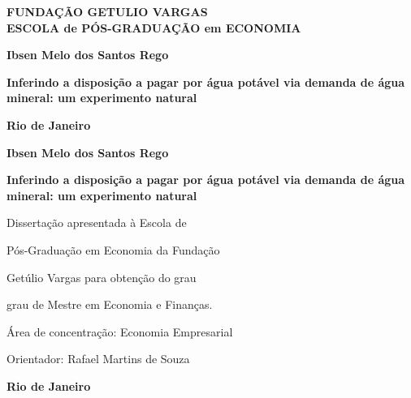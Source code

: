 \documentclass[
  12pt,
]{book}
\author{}
\date{\vspace{-2.5em}}
\begin{document}

\begin{titlepage}

	\begin{center}
		{\LARGE \textbf{FUNDAÇÃO GETULIO VARGAS\\ ESCOLA de PÓS-GRADUAÇÃO em ECONOMIA}}

		\par
		\vspace{120pt}
		{\LARGE \textbf{Ibsen Melo dos Santos Rego}}

		\par
		\vspace{120pt}
		{\Huge \textbf{Inferindo a disposição a pagar por água potável via demanda de água mineral: um experimento natural}}

		\par
		\vfill
		\textbf{{\large Rio de Janeiro}\\
		{\large \number\year}}
	\end{center}
\end{titlepage}
\begin{titlepage}
    \begin{center}
		{\LARGE \textbf{Ibsen Melo dos Santos Rego}}

		\par
		\vspace{120pt}
		{\LARGE \textbf{Inferindo a disposição a pagar por água potável via demanda de água mineral: um experimento natural}}
    \vspace{80pt}



    \end{center}


     \hspace{4.5cm} {Dissertação apresentada à Escola de}

    \hspace{4.5cm} {Pós-Graduação em Economia da Fundação}

    \hspace{4.5cm} {Getúlio Vargas para obtenção do grau}

    \hspace{4.5cm} {grau de Mestre em Economia e Finanças.}
    \vspace{45pt}

    \hspace{4.5cm} {Área de concentração: Economia Empresarial}
    \vspace{15pt}

    \hspace{4.5cm} {Orientador: Rafael Martins de Souza}

    \begin{center}
        \par
		\vfill
		\textbf{{\large Rio de Janeiro}\\
		{\large \number\year}}
	\end{center}


\end{titlepage}
\end{document}
